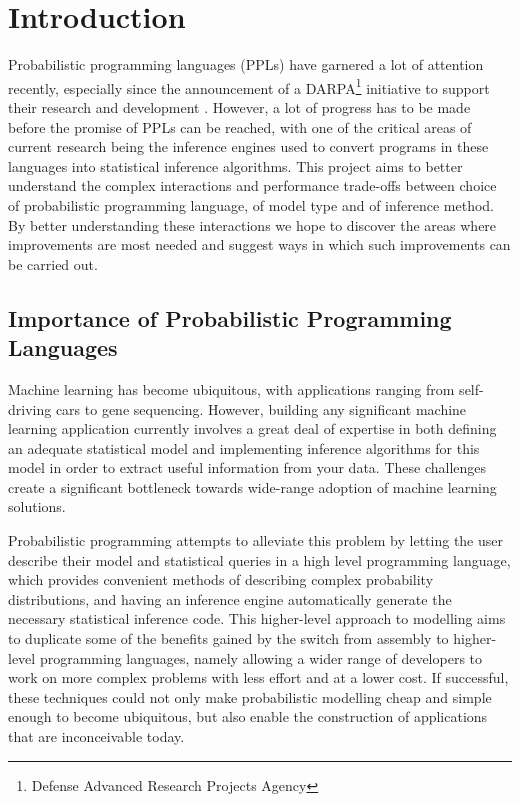 \chapter{Introduction}

\setcounter{page}{1} 

Probabilistic programming languages (PPLs) have garnered a lot of attention recently, especially since the announcement of a DARPA\footnote{Defense Advanced Research Projects Agency} initiative to support their research and development \cite{ppaml}. However, a lot of progress has to be made before the promise of PPLs can be reached, with one of the critical areas of current research being the inference engines used to convert programs in these languages into statistical inference algorithms. This project aims to better understand the complex interactions and performance trade-offs between choice of probabilistic programming language, of model type and of inference method. By better understanding these interactions we hope to discover the areas where improvements are most needed and suggest ways in which such improvements can be carried out.

\section{Importance of Probabilistic Programming Languages}
\label{sect:importance}
Machine learning has become ubiquitous, with applications ranging from self-driving cars to gene sequencing. However, building any significant machine learning application currently involves a great deal of expertise in both defining an adequate statistical model and implementing inference algorithms for this model in order to extract useful information from your data. These challenges create a significant bottleneck towards wide-range adoption of machine learning solutions.

Probabilistic programming attempts to alleviate this problem by letting the user describe their model and statistical queries in a high level programming language, which provides convenient methods of
describing complex probability distributions, and having an inference engine automatically generate the necessary statistical inference code. This higher-level approach to modelling aims to duplicate some of the benefits gained by the switch from assembly to higher-level programming languages, namely allowing a wider range of developers to work on more complex problems with less effort and at a lower cost. If successful, these techniques could not only make probabilistic modelling cheap and simple enough to become ubiquitous, but also enable the construction of applications that are inconceivable today.

